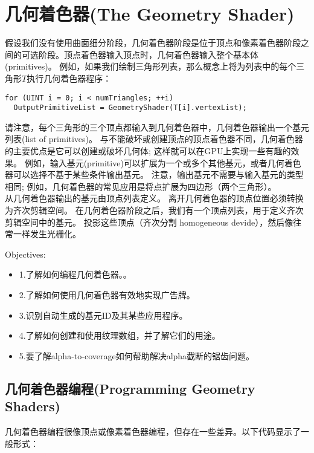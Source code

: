 \chapter{几何着色器(The Geometry Shader)}
\begin{flushleft}
假设我们没有使用曲面细分阶段，几何着色器阶段是位于顶点和像素着色器阶段之间的可选阶段。顶点着色器输入顶点时，几何着色器输入整个基本体(primitives)。 例如，如果我们绘制三角形列表，那么概念上将为列表中的每个三角形$T$执行几何着色器程序：\\
\end{flushleft}

\begin{lstlisting}
for (UINT i = 0; i < numTriangles; ++i)
  OutputPrimitiveList = GeometryShader(T[i].vertexList);
\end{lstlisting}

\begin{flushleft}
请注意，每个三角形的三个顶点都输入到几何着色器中，几何着色器输出一个基元列表(list of primitives)。 与不能破坏或创建顶点的顶点着色器不同，几何着色器的主要优点是它可以创建或破坏几何体; 这样就可以在GPU上实现一些有趣的效果。 例如，输入基元(primitive)可以扩展为一个或多个其他基元，或者几何着色器可以选择不基于某些条件输出基元。 注意，输出基元不需要与输入基元的类型相同; 例如，几何着色器的常见应用是将点扩展为四边形（两个三角形）。\\

从几何着色器输出的基元由顶点列表定义。 离开几何着色器的顶点位置必须转换为齐次剪辑空间。 在几何着色器阶段之后，我们有一个顶点列表，用于定义齐次剪辑空间中的基元。 投影这些顶点（齐次分割 homogeneous devide），然后像往常一样发生光栅化。
\end{flushleft}

{\large Objectives:}
\begin{itemize}
    \item 1.了解如何编程几何着色器。。
    \item 2.了解如何使用几何着色器有效地实现广告牌。
    \item 3.识别自动生成的基元ID及其某些应用程序。
    \item 4.了解如何创建和使用纹理数组，并了解它们的用途。
    \item 5.要了解alpha-to-coverage如何帮助解决alpha截断的锯齿问题。
\end{itemize}

\section{几何着色器编程(Programming Geometry Shaders)}
\begin{flushleft}
几何着色器编程很像顶点或像素着色器编程，但存在一些差异。以下代码显示了一般形式：\\
\end{flushleft}

